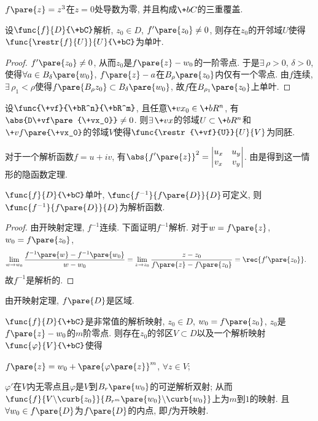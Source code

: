 \documentclass{ctexart}
\begin{document}
\begin{sample}
    \begin{ex}
        $f\pare{z} = z^3$在$z=0$处导数为零, 并且构成$\+bC$的三重覆盖.
    \end{ex}
\end{sample}
\begin{corollary}
    设$\func{f}{D}{\+bC}$解析, $z_0 \in D$, $f'\pare{z_0}\neq 0$, 则存在$z_0$的开邻域$U$使得$\func{\restr{f}{U}}{U}{\+bC}$为单叶.
\end{corollary}
\begin{proof}
    $f'\pare{z_0}\neq 0$, 从而$z_0$是$f\pare{z} - w_0$的一阶零点. 于是$\exists\, \rho > 0$, $\delta > 0$, 使得$\forall a\in B_\delta\pare{w_0}$, $f\pare{z} - a$在$B_\rho\pare{z_0}$内仅有一个零点. 由$f$连续, $\exists\, \rho_1 < \rho$使得$f\pare{B_\rho{z_0}}\subset B_\delta\pare{w_0}$, 故$f$在$B_{\rho_1}\pare{z_0}$上单叶.
\end{proof}
\begin{remark}
    设$\func{\+vf}{\+bR^n}{\+bR^m}$, 且任意$\+vx_0\in\+bR^n$, 有$\abs{D\+vf\pare{\+vx_0}}\neq 0$. 则$\exists\, \+vx$的邻域$U\subset \+bR^n$和$\+vf\pare{\+vx_0}$的邻域$V$使得$\func{\restr{\+vf}{U}}{U}{V}$为同胚.
\end{remark}
\begin{remark}
    对于一个解析函数$f = u+iv$, 有$\displaystyle \abs{f'\pare{z}}^2 = \begin{vmatrix}
        u_x & u_y \\
        v_x & v_y
    \end{vmatrix}$. 由是得到这一情形的隐函数定理.
\end{remark}
\begin{corollary}
    $\func{f}{D}{\+bC}$单叶, $\func{f^{-1}}{f\pare{D}}{D}$可定义, 则$\func{f^{-1}}{f\pare{D}}{D}$为解析函数.
\end{corollary}
\begin{proof}
    由开映射定理, $f^{-1}$连续. 下面证明$f^{-1}$解析. 对于$w = f\pare{z}$, $w_0 = f\pare{z_0}$,
    \begin{align*}
        \lim_{w\rightarrow w_0} \frac{f^{-1}\pare{w} - f^{-1}\pare{w_0}}{w-w_0} &= \lim_{z\rightarrow z_0} \frac{z-z_0}{f\pare{z} - f\pare{z_0}} = \rec{f'\pare{z_0}}.
    \end{align*}
    故$f^{-1}$是解析的.
\end{proof}
\begin{remark}
    由开映射定理, $f\pare{D}$是区域.
\end{remark}
\begin{theorem}
    $\func{f}{D}{\+bC}$是非常值的解析映射, $z_0 \in D$, $w_0 = f\pare{z_0}$, $z_0$是$f\pare{z} - w_0$的$m$阶零点. 则存在$z_0$的邻区$V\subset D$以及一个解析映射$\func{\varphi}{V}{\+bC}$使得
    \begin{cenum}
        \item $f\pare{z} = w_0 + \pare{\varphi\pare{z}}^m$, $\forall z\in V$;
        \item $\varphi'$在$V$内无零点且$\varphi$是$V$到$B_r\pare{w_0}$的可逆解析双射; 从而$\func{f}{V\backslash \curb{z_0}}{B_{r^m}\pare{w_0}\backslash\curb{w_0}}$上为$m$到$1$的映射. 且$\forall w_0 \in f\pare{D}$为$f\pare{D}$的内点, 即$f$为开映射.
    \end{cenum}
\end{theorem}
\end{document}
